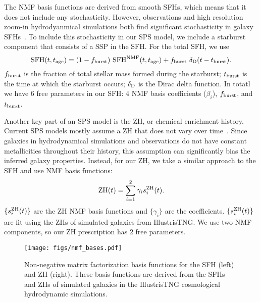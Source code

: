 The NMF basis functions are derived from smooth SFHs, which means that it does
not include any stochasticity. 
However, observations and high resolution zoom-in hydrodyanmical simulations
both find significant stochasticity in galaxy SFHs~\citep{sparre2017,
caplar2019, hahn2019b, iyer2020}. 
To include this stochasticity in our SPS model, we include a starburst
component that consists of a SSP in the SFH. 
For the total SFH, we use
\begin{equation}
    {\rm SFH} (t, t_{\rm age}) = (1 - f_{\rm burst})~{\rm SFH}^{\rm NMF} (t,
    t_{\rm age}) + f_{\rm burst}~\delta_{\rm D}(t - t_{\rm burst}).
\end{equation}
$f_{\rm burst}$ is the fraction of total stellar mass formed during the
starburst; $t_{\rm burst}$ is the time at which the starburst occurs; 
$\delta_{\rm D}$ is the Dirac delta function.
In totatl we have 6 free parameters in our SFH: 4 NMF basis coefficients 
($\beta_i$), $f_{\rm burst}$, and $t_{\rm burst}$. 

Another key part of an SPS model is the ZH, or chemical enrichment history. 
Current SPS models mostly assume a ZH that does not vary over
time~\citep{carnall2017, leja2019}. 
Since galaxies in hydrodynamical simulations and observations do not have
constant metallicities throughout their history, this assumption can
significantly bias the inferred galaxy properties. 
Instead, for our ZH, we take a similar approach to the SFH and use NMF basis
functions:
\begin{equation}
    {\rm ZH}(t) = \sum\limits_{i=1}^2 \gamma_i s_i^{\rm ZH}(t).
\end{equation} 
$\{s_i^{\rm ZH}(t)\}$ are the ZH NMF basis functions and $\{\gamma_i\}$ are the
coefficients. 
$\{s_i^{\rm ZH}(t)\}$ are fit using the ZHs of simulated galaxies from IllustrisTNG. 
We use two NMF components, so our ZH prescription has 2 free parameters. 



\begin{figure}
\begin{center}
\texttt{[image: figs/nmf\_bases.pdf]} 
    \label{fig:nmf}
    \caption{
        Non-negative matrix factorization basis functions for the SFH
        (left) and ZH (right). 
        These basis functions are derived from the SFHs and ZHs of simulated
        galaxies in the IllustrisTNG cosmological hydrodynamic simulations. 
    }
\end{center}
\end{figure}

